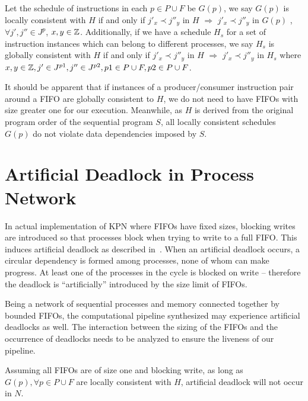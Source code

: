 \begin{definition}
Let the schedule of instructions in each $p \in P \cup F$ be $G(p)$, we say $G(p)$ is locally consistent with $H$ if
and only if
$j'_x \prec j''_y$ in $H$ $\Rightarrow$ $j'_x \prec j''_y$ in $G(p)$
, $\forall j', j'' \in J^p$, 
$x, y \in \Bbb{Z}$. Additionally, if we have a schedule $H_s$ for a set of instruction instances  which can belong to different processes, we say $H_s$ is globally consistent with
$H$ if and only if $j'_x \prec j''_y$ in $H$ $\Rightarrow$ $j'_x \prec j''_y$ in $H_s$
 where  $x,y \in \Bbb{Z}, j' \in J^{p1}, j'' \in J^{p2}, p1 \in P \cup F, p2 \in P \cup F$.
\end{definition}


It should be apparent that if instances of a producer/consumer
instruction pair around a FIFO are globally consistent to $H$, we
do not need to have FIFOs with size greater one for our execution.
Meanwhile, as $H$ is derived from the original program order of
the sequential program $S$, all locally consistent schedules $G(p)$ 
do not violate data dependencies imposed by $S$.


\section{Artificial Deadlock in Process Network}
In actual implementation of KPN where FIFOs have fixed sizes, blocking
writes are introduced so that processes block when trying to write to a full FIFO.
This induces artificial deadlock as described in~\cite{}. 
When an artificial deadlock occurs, a circular dependency is formed among
processes, none of whom can make progress. At least one of the processes
in the cycle is blocked on write -- therefore the deadlock is ``artificially''
introduced by the size limit of FIFOs. 

Being a network of sequential processes and memory connected together by
bounded FIFOs, the computational pipeline synthesized may experience
artificial deadlocks as well. The interaction between the sizing of the FIFOs 
and the occurrence of deadlocks needs to be analyzed to ensure the liveness
of our pipeline.

\begin{lemma}
\label{nondeadlock}
Assuming 
all FIFOs are of size one and blocking write,
as long as $G(p), \forall p \in P \cup F$ are locally consistent with $H$,
artificial deadlock will not occur in $N$. 
\end{lemma}


